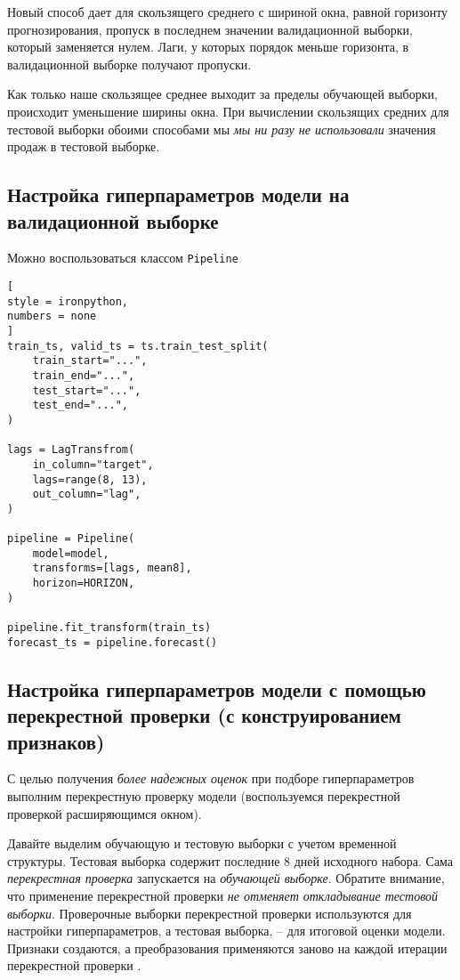 \documentclass[%
	11pt,
	a4paper,
	utf8,
		]{article}
\begin{document}
Новый способ дает для скользящего среднего с шириной окна, равной горизонту прогнозирования, пропуск в последнем значении валидационной выборки, который заменяется нулем. Лаги, у которых порядок меньше горизонта, в валидационной выборке получают пропуски.

Как только наше скользящее среднее выходит за пределы обучающей выборки, происходит уменьшение ширины окна. При вычислении скользящих средних для тестовой выборки обоими способами мы \emph{мы ни разу не использовали} значения продаж в тестовой выборке.

\subsection{Настройка гиперпараметров модели на валидационной выборке}

Можно воспользоваться классом \verb|Pipeline|
\begin{lstlisting}[
style = ironpython,
numbers = none
]
train_ts, valid_ts = ts.train_test_split(
    train_start="...",
    train_end="...",
    test_start="...",
    test_end="...",
)

lags = LagTransfrom(
    in_column="target",
    lags=range(8, 13),
    out_column="lag",
)

pipeline = Pipeline(
    model=model,
    transforms=[lags, mean8],
    horizon=HORIZON,
)

pipeline.fit_transform(train_ts)
forecast_ts = pipeline.forecast()
\end{lstlisting}

\subsection{Настройка гиперпараметров модели с помощью перекрестной проверки (с конструированием признаков)}

С целью получения \emph{более надежных оценок} при подборе гиперпараметров выполним перекрестную проверку модели (воспользуемся перекрестной проверкой расширяющимся окном).

Давайте выделим обучающую и тестовую выборки с учетом временной структуры. Тестовая выборка содержит последние 8 дней исходного набора. Сама \emph{перекрестная проверка} запускается на \emph{обучающей выборке}. Обратите внимание, что применение перекрестной проверки \emph{не отменяет откладывание тестовой выборки}. Проверочные выборки перекрестной проверки используются для настройки гиперпараметров, а тестовая выборка, -- для итоговой оценки модели. Признаки создаются, а преобразования применяются заново на каждой итерации перекрестной проверки \cite[]{gruzdev:time-series-2022}.
\end{document}
